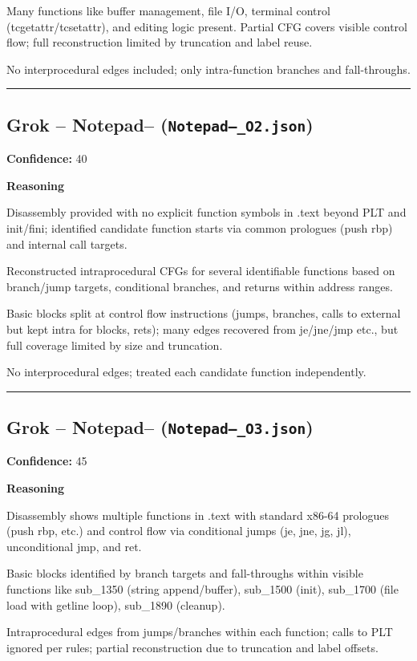 Many functions like buffer management, file I/O, terminal control (tcgetattr/tcsetattr), and editing logic present. Partial CFG covers visible control flow; full reconstruction limited by truncation and label reuse.

No interprocedural edges included; only intra-function branches and fall-throughs.

\bigskip
\hrule
\bigskip

\subsection{Grok -- Notepad-- (\texttt{Notepad--\_O2.json})}

\textbf{Confidence:} 40

\textbf{Reasoning}

Disassembly provided with no explicit function symbols in .text beyond PLT and init/fini; identified candidate function starts via common prologues (push rbp) and internal call targets.

Reconstructed intraprocedural CFGs for several identifiable functions based on branch/jump targets, conditional branches, and returns within address ranges.

Basic blocks split at control flow instructions (jumps, branches, calls to external but kept intra for blocks, rets); many edges recovered from je/jne/jmp etc., but full coverage limited by size and truncation.

No interprocedural edges; treated each candidate function independently.

\bigskip
\hrule
\bigskip

\subsection{Grok -- Notepad-- (\texttt{Notepad--\_O3.json})}

\textbf{Confidence:} 45

\textbf{Reasoning}

Disassembly shows multiple functions in .text with standard x86-64 prologues (push rbp, etc.) and control flow via conditional jumps (je, jne, jg, jl), unconditional jmp, and ret.

Basic blocks identified by branch targets and fall-throughs within visible functions like sub\_1350 (string append/buffer), sub\_1500 (init), sub\_1700 (file load with getline loop), sub\_1890 (cleanup).

Intraprocedural edges from jumps/branches within each function; calls to PLT ignored per rules; partial reconstruction due to truncation and label offsets.

